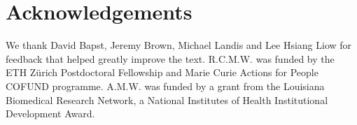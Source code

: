 \documentclass[11pt]{article}
\newcommand{\rw}[1]{{\textcolor{red}{[RW: #1]}}} %
\newcommand{\aw}[1]{{\textcolor{armygreen}{[AW: #1]}}} %
\begin{document}



\section{Acknowledgements}
We thank David Bapst, Jeremy Brown, Michael Landis and Lee Hsiang Liow for feedback that helped greatly improve the text.
R.C.M.W. was funded by the ETH Z\"urich Postdoctoral Fellowship and Marie Curie Actions for People COFUND programme.
A.M.W. was funded by a grant from the Louisiana Biomedical Research Network, a National Institutes of Health Institutional Development Award.

\clearpage



\clearpage
\end{document}

